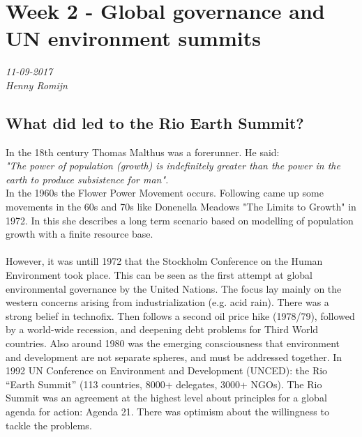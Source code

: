 \chapter{Week 2 - Global governance and UN environment summits}
\textit{11-09-2017 \\
Henny Romijn}
\section{What did led to the Rio Earth Summit?}
In the 18th century Thomas Malthus was a forerunner. He said: \\
\textit{"The power of population (growth) is indefinitely greater than the power in the earth to produce subsistence for man".} \\
In the 1960s the Flower Power Movement occurs. Following came up some movements in the 60s and 70s like Donenella Meadows "The Limits to Growth" in 1972. In this she describes a long term scenario based on modelling of population growth with a finite resource base. \\
\\
However, it was untill 1972 that the Stockholm Conference on the Human Environment took place. This can be seen as the first attempt at global environmental governance by the United Nations. The focus lay mainly on the western concerns arising from industrialization (e.g. acid rain). There was a strong belief in technofix. Then follows a second oil price hike (1978/79), followed by a world-wide recession, and deepening debt problems for Third World countries. Also around 1980 was the emerging consciousness that environment and development are not separate spheres, and must be addressed together. In 1992 UN Conference on Environment and Development (UNCED): the Rio “Earth Summit” (113 countries, 8000+ delegates, 3000+ NGOs). The Rio Summit was an agreement at the highest level about principles for a global agenda for action: Agenda 21. There was optimism about the willingness to tackle the problems. 

